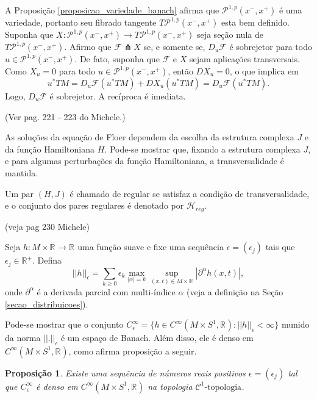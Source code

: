 \documentclass[12pt]{book}
\newtheorem{proposicao}[teorema]{Proposição}
\newcommand{\caminhosexponenciaisconectantes}[2]{\mathcal{P}^{1,p}(#1, #2)}
\newcommand{\caminhosexponenciaisconectantespadrao}{\caminhosexponenciaisconectantes{x^{-}}{x^{+}}}
\newcommand{\circulo}{S^{1}}
\newcommand{\cktopologia}[1]{\mathcal{C}^{#1}\text{-topologia}}
\newcommand{\diferencialfloerponto}[1]{D_{#1}\operadorFloer}
\newcommand{\funcoessuaves}[1]{C^{\infty}(#1, \real{})}
\newcommand{\operadorFloer}{\mathcal{F}}
\newcommand{\norma}[1]{||#1||}
\newcommand{\paresregulares}{\mathcal{H}_{reg}}
\newcommand{\pullbackfibradotangente}[2]{#1^{*}T#2}
\newcommand{\pullbackfibradotangenteM}[1]{\pullbackfibradotangente{#1}{M}}
\newcommand{\real}[1]{\mathbb{R}^{#1}}
\newcommand{\reta}{\real{}}
\newcommand{\aviso}[1]{{\color{violet}(#1)}}
\begin{document}
	A Proposição \ref{proposicao_variedade_banach} afirma que $\caminhosexponenciaisconectantespadrao$ é uma variedade, portanto seu fibrado tangente $T\caminhosexponenciaisconectantespadrao$ esta bem definido. Suponha que $X:\caminhosexponenciaisconectantespadrao \to T\caminhosexponenciaisconectantespadrao$ seja seção nula de $T\caminhosexponenciaisconectantespadrao$. Afirmo que $\operadorFloer \pitchfork X$ se, e somente se, $\diferencialfloerponto{u}$ é sobrejetor para todo $u\in \caminhosexponenciaisconectantespadrao$. De fato, suponha que $\operadorFloer$ e $X$ sejam aplicações transversais. Como $X_{u} = 0$ para todo $u \in \caminhosexponenciaisconectantespadrao$, então $DX_{u} = 0$, o que implica em
	$$
	\pullbackfibradotangenteM{u}=\diferencialfloerponto{u}(\pullbackfibradotangenteM{u})+DX_{u}(\pullbackfibradotangenteM{u}) = \diferencialfloerponto{u}(\pullbackfibradotangenteM{u}).$$ 
	Logo, $\diferencialfloerponto{u}$ é sobrejetor. A recíproca é imediata.
	
	\aviso{Ver pag. 221 - 223 do Michele.}
	
	As soluções da equação de Floer dependem da escolha da estrutura complexa $J$ e da função Hamiltoniana $H$. Pode-se mostrar que, fixando a estrutura complexa $J$, e para algumas perturbações da função Hamiltoniana, a transversalidade é mantida.
	
	Um par $(H, J)$ é chamado de regular se satisfaz a condição de transversalidade, e o conjunto dos pares regulares é denotado por $\paresregulares$.
	
	\aviso{veja pag 230 Michele}
	
	Seja $h :M\times \reta\to \reta$ uma função suave e fixe uma sequência $\epsilon=(\epsilon_{j})$ tais que $\epsilon_{j}\in \real{+}$. Defina
	$$
	\norma{h}_{\epsilon} = \sum_{k\geq 0}\epsilon_{k}\max_{|\alpha|=k} \sup_{(x,t)\in M\times \reta}|\partial^{\alpha}h(x,t)|,
	$$
	onde $\partial^{\alpha}$ é a derivada parcial com multi-índice $\alpha$ (veja a definição na Seção \ref{secao_distribuicoes}).
	
	Pode-se mostrar que o conjunto $C^{\infty}_{\epsilon} = \{h\in \funcoessuaves{M\times \circulo}: \norma{h}_{\epsilon}<\infty \}$ munido da norma $\norma{.}_{\epsilon}$ é um espaço de Banach. Além disso, ele é denso em $\funcoessuaves{M\times\circulo}$, como afirma proposição a seguir.
	
	\begin{proposicao}\label{proposicao_densidade_perturbacao_hamiltoniana}
		Existe uma sequência de números reais positivos $\epsilon=(\epsilon_{j})$ tal que $C^{\infty}_{\epsilon}$ é denso em $\funcoessuaves{M\times\circulo}$ na topologia $\cktopologia{1}$.
	\end{proposicao}
	
\end{document}
